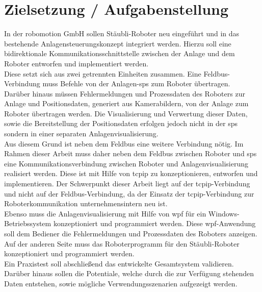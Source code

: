 \documentclass[ a4paper,
                oneside,
                toc=bibliography,
                toc=listof
                ]{scrbook}
\begin{document}
	\section{Zielsetzung / Aufgabenstellung}
	In der \glqq robomotion GmbH\grqq{} sollen Stäubli-Roboter neu eingeführt und in das bestehende Anlagensteuerungskonzept integriert werden. Hierzu soll eine bidirektionale Kommunikationsschnittstelle zwischen der Anlage und dem Roboter entworfen und implementiert werden. \\
	Diese setzt sich aus zwei getrennten Einheiten zusammen. Eine Feldbus-Verbindung muss Befehle von der Anlagen-\ac{sps} zum Roboter übertragen.\\
	Darüber hinaus müssen Fehlermeldungen und Prozessdaten des Roboters zur Anlage und Positionsdaten, generiert aus Kamerabildern, von der Anlage zum Roboter übertragen werden. Die Visualisierung und Verwertung dieser Daten, sowie die Bereitstellung der Positionsdaten erfolgen jedoch nicht in der \ac{sps} sondern in einer separaten Anlagenvisualisierung.\\
	Aus diesem Grund ist neben dem Feldbus eine weitere Verbindung nötig. Im Rahmen dieser Arbeit muss daher neben dem Feldbus zwischen Roboter und \ac{sps} eine Kommunikationsverbindung zwischen Roboter und Anlagenvisualisierung realisiert werden. Diese ist mit Hilfe von \ac{tcpip} zu konzeptionieren, entworfen und implementieren. Der Schwerpunkt dieser Arbeit liegt auf der \ac{tcpip}-Verbindung und nicht auf der Feldbus-Verbindung, da der Einsatz der \ac{tcpip}-Verbindung zur Roboterkommunikation unternehmensintern neu ist.\\
	Ebenso muss die Anlagenvisualisierung mit Hilfe von \ac{wpf} für ein Windows-Betriebssystem konzeptioniert und programmiert werden. Diese \ac{wpf}-Anwendung soll dem Bediener die Fehlermeldungen und Prozessdaten des Roboters anzeigen. Auf der anderen Seite muss das Roboterprogramm für den Stäubli-Roboter konzeptioniert und programmiert werden. \\
	Ein Praxistest soll abschließend das entwickelte Gesamtsystem validieren. Darüber hinaus sollen die Potentiale, welche durch die zur Verfügung stehenden Daten entstehen, sowie mögliche Verwendungsszenarien aufgezeigt werden.
	
\end{document}
